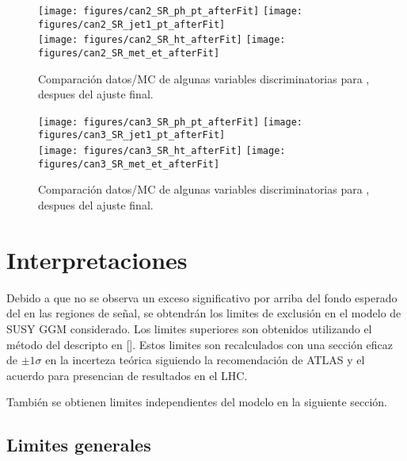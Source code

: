 \begin{figure}[ht!]
  \begin{center}
   \texttt{[image: figures/can2\_SR\_ph\_pt\_afterFit]}
   \texttt{[image: figures/can2\_SR\_jet1\_pt\_afterFit]}\\
   \texttt{[image: figures/can2\_SR\_ht\_afterFit]}
   \texttt{[image: figures/can2\_SR\_met\_et\_afterFit]}
   \caption{Comparación datos/MC de algunas variables discriminatorias
     para {\SRL}, despues del ajuste final.}
    \label{fig:unblind_dist_2}
  \end{center}
\end{figure}

\begin{figure}[h!]
  \begin{center}
   \texttt{[image: figures/can3\_SR\_ph\_pt\_afterFit]}
   \texttt{[image: figures/can3\_SR\_jet1\_pt\_afterFit]}\\
   \texttt{[image: figures/can3\_SR\_ht\_afterFit]}
   \texttt{[image: figures/can3\_SR\_met\_et\_afterFit]}
   \caption{Comparación datos/MC de algunas variables discriminatorias
     para {\SRH}, despues del ajuste final.}
    \label{fig:unblind_dist_3}
  \end{center}
\end{figure}

\clearpage

\section{Interpretaciones} \label{sec:interpretations}

Debido a que no se observa un exceso significativo por
arriba del fondo esperado del {\SM} en las regiones de
señal, se obtendrán los limites de exclusión en el modelo
de SUSY GGM considerado. Los limites superiores son obtenidos
utilizando el método del {\cls} descripto en []. Estos limites
son recalculados con una sección eficaz de $\pm 1 \sigma$ en la
incerteza teórica siguiendo la recomendación de ATLAS y el acuerdo
para presencian de resultados en el LHC.

También se obtienen limites independientes del modelo en la siguiente
sección.

\subsection{Limites generales} \label{sec:model_independent}

